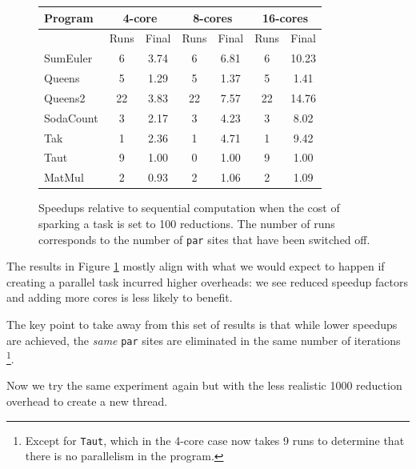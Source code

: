 \begin{figure}[ht]
\centering
  \begin{tabular}{ |l||c c|c c|c c| }
    \hline
    Program & \multicolumn{2}{c|}{4-core} & \multicolumn{2}{c|}{8-cores} & \multicolumn{2}{c|}{16-cores} \\
    \hline
            & Runs & Final     & Runs & Final      & Runs & Final \\
    \hline
    SumEuler  & 6    & 3.74      & 6    & 6.81       & 6    & 10.23     \\
    Queens    & 5    & 1.29      & 5    & 1.37       & 5    & 1.41  \\
    Queens2   & 22   & 3.83      & 22   & 7.57       & 22   & 14.76  \\
    SodaCount & 3    & 2.17      & 3    & 4.23       & 3    & 8.02    \\
    Tak       & 1    & 2.36      & 1    & 4.71       & 1    & 9.42   \\
    Taut      & 9    & 1.00      & 0    & 1.00       & 9    & 1.00  \\
    MatMul    & 2    & 0.93      & 2    & 1.06       & 2    & 1.09   \\
    \hline
  \end{tabular}
\caption{Speedups relative to sequential computation when the cost of sparking
        a task is set to 100 reductions. The number of runs corresponds to the
        number of \texttt{par} sites that have been switched off.}
\label{table100}
\end{figure}

The results in Figure \ref{table100} mostly align with what we would expect to
happen if creating a parallel task incurred higher overheads: we see reduced
speedup factors and adding more cores is less likely to benefit.

The key point to take away from this set of results is that while lower speedups
are achieved, the \emph{same} \verb-par- sites are eliminated in the same
number of iterations \footnote{Except for \texttt{Taut}, which in the 4-core case now
takes 9 runs to determine that there is no parallelism in the program.}.

Now we try the same experiment again but with the less realistic 1000 reduction
overhead to create a new thread.

